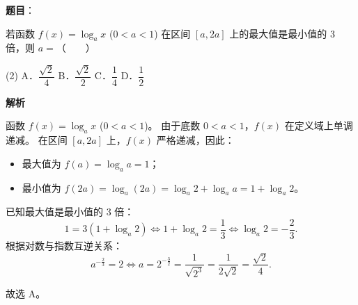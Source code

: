\begin{answer}

\textbf{题目}：

若函数 $f(x) = \log_a x$ ($0 < a < 1$) 在区间 $[a, 2a]$ 上的最大值是最小值的 3 倍，则 $a =$\mbox{（　　）}

\begin{gkopts}(2)
\task A．$\dfrac{\sqrt{2}}{4}$
\task B．$\dfrac{\sqrt{2}}{2}$
\task C．$\dfrac{1}{4}$
\task D．$\dfrac{1}{2}$
\end{gkopts}

\textbf{解析}

函数 $f(x) = \log_a x$ ($0 < a < 1$)。
由于底数 $0 < a < 1$，$f(x)$ 在定义域上单调递减。
在区间 $[a, 2a]$ 上，$f(x)$ 严格递减，因此：
\begin{itemize}
\item 最大值为 $f(a) = \log_a a = 1$；
\item 最小值为 $f(2a) = \log_a(2a) = \log_a 2 + \log_a a = 1 + \log_a 2$。
\end{itemize}

已知最大值是最小值的 3 倍：
\nopagebreak[4]
\[
1 = 3(1 + \log_a 2) \iff 1 + \log_a 2 = \dfrac{1}{3} \iff \log_a 2 = -\dfrac{2}{3}.
\]
根据对数与指数互逆关系：
\nopagebreak[4]
\[
a^{-\frac{2}{3}} = 2 \iff a = 2^{-\frac{3}{2}} = \dfrac{1}{\sqrt{2^3}} = \dfrac{1}{2\sqrt{2}} = \dfrac{\sqrt{2}}{4}.
\]

故选 A。


\end{answer}
